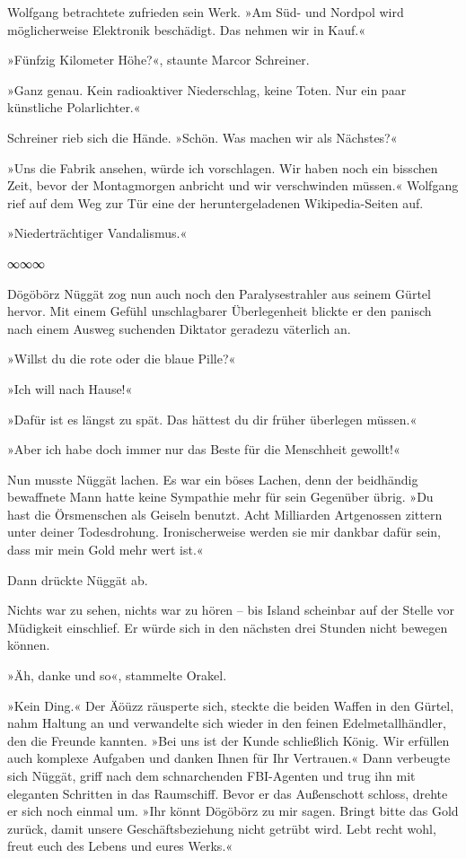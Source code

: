 Wolfgang betrachtete zufrieden sein Werk. »Am Süd- und Nordpol wird möglicherweise Elektronik beschädigt. Das nehmen wir in Kauf.«

»Fünfzig Kilometer Höhe?«, staunte Marcor Schreiner.

»Ganz genau. Kein radioaktiver Niederschlag, keine Toten. Nur ein paar künstliche Polarlichter.«

Schreiner rieb sich die Hände. »Schön. Was machen wir als Nächstes?«

»Uns die Fabrik ansehen, würde ich vorschlagen. Wir haben noch ein bisschen Zeit, bevor der Montagmorgen anbricht und wir verschwinden müssen.« Wolfgang rief auf dem Weg zur Tür eine der heruntergeladenen Wikipedia-Seiten auf.


»Niederträchtiger Vandalismus.«

\begin{center}
∞∞∞
\end{center}

Dögöbörz Nüggät zog nun auch noch den Paralysestrahler aus seinem Gürtel hervor. Mit einem Gefühl unschlagbarer Überlegenheit blickte er den panisch nach einem Ausweg suchenden Diktator geradezu väterlich an.

»Willst du die rote oder die blaue Pille?«

»Ich will nach Hause!«

»Dafür ist es längst zu spät. Das hättest du dir früher überlegen müssen.«

»Aber ich habe doch immer nur das Beste für die Menschheit gewollt!«

Nun musste Nüggät lachen. Es war ein böses Lachen, denn der beidhändig bewaffnete Mann hatte keine Sympathie mehr für sein Gegenüber übrig. »Du hast die Örsmenschen als Geiseln benutzt. Acht Milliarden Artgenossen zittern unter deiner Todesdrohung. Ironischerweise werden sie mir dankbar dafür sein, dass mir mein Gold mehr wert ist.«

Dann drückte Nüggät ab.

Nichts war zu sehen, nichts war zu hören – bis Island scheinbar auf der Stelle vor Müdigkeit einschlief. Er würde sich in den nächsten drei Stunden nicht bewegen können.

»Äh, danke und so«, stammelte Orakel.

»Kein Ding.« Der Äöüzz räusperte sich, steckte die beiden Waffen in den Gürtel, nahm Haltung an und verwandelte sich wieder in den feinen Edelmetallhändler, den die Freunde kannten. »Bei uns ist der Kunde schließlich König. Wir erfüllen auch komplexe Aufgaben und danken Ihnen für Ihr Vertrauen.« Dann verbeugte sich Nüggät, griff nach dem schnarchenden FBI-Agenten und trug ihn mit eleganten Schritten in das Raumschiff. Bevor er das Außenschott schloss, drehte er sich noch einmal um. »Ihr könnt Dögöbörz zu mir sagen. Bringt bitte das Gold zurück, damit unsere Geschäftsbeziehung nicht getrübt wird. Lebt recht wohl, freut euch des Lebens und eures Werks.«


